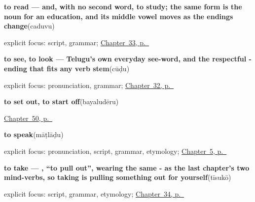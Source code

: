 \noindent\begin{minipage}[t]{\linewidth}
\raggedright
\textbf{to read — and, with no second word, to study; the same form is the noun for an education, and its middle vowel moves as the endings change}\enspace\emph{}\enspace(caduvu)\par
\footnotesize explicit focus: script, grammar; \hyperref[ch:te-verbs-of-the-mind]{Chapter~33, p.~\pageref*{ch:te-verbs-of-the-mind}}
\end{minipage}\par\smallskip

\noindent\begin{minipage}[t]{\linewidth}
\raggedright
\textbf{to see, to look — Telugu's own everyday see-word, and the respectful - ending that fits any verb stem}\enspace\emph{}\enspace(cūḍu)\par
\footnotesize explicit focus: pronunciation, grammar; \hyperref[ch:te-core-verbs]{Chapter~32, p.~\pageref*{ch:te-core-verbs}}
\end{minipage}\par\smallskip

\noindent\begin{minipage}[t]{\linewidth}
\raggedright
\textbf{to set out, to start off}\enspace\emph{}\enspace(bayaludēru)\par
\footnotesize \hyperref[ch:te-leave-more]{Chapter~50, p.~\pageref*{ch:te-leave-more}}
\end{minipage}\par\smallskip

\noindent\begin{minipage}[t]{\linewidth}
\raggedright
\textbf{to speak}\enspace\emph{}\enspace(māṭlāḍu)\par
\footnotesize explicit focus: pronunciation, script, grammar, etymology; \hyperref[ch:first-verbs]{Chapter~5, p.~\pageref*{ch:first-verbs}}
\end{minipage}\par\smallskip

\noindent\begin{minipage}[t]{\linewidth}
\raggedright
\textbf{to take — , \textquotedblleft{}to pull out\textquotedblright{}, wearing the same - as the last chapter's two mind-verbs, so taking is pulling something out for yourself}\enspace\emph{}\enspace(tīsukō)\par
\footnotesize explicit focus: script, grammar, etymology; \hyperref[ch:te-verbs-between-people]{Chapter~34, p.~\pageref*{ch:te-verbs-between-people}}
\end{minipage}\par\smallskip

